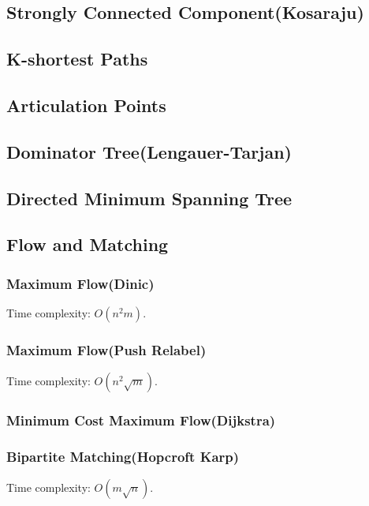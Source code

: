 \documentclass{article}
\begin{document}
    \subsection{Strongly Connected Component(Kosaraju)}
    
    \subsection{K-shortest Paths}

    \subsection{Articulation Points}
    
    \subsection{Dominator Tree(Lengauer-Tarjan)}
    
    \subsection{Directed Minimum Spanning Tree}
    
    \subsection{Flow and Matching}
        \subsubsection{Maximum Flow(Dinic)}
            Time complexity: $O(n^2m)$.
            
        \subsubsection{Maximum Flow(Push Relabel)}
            Time complexity: $O(n^2\sqrt m)$.
            
        \subsubsection{Minimum Cost Maximum Flow(Dijkstra)}
            
        \subsubsection{Bipartite Matching(Hopcroft Karp)}
            Time complexity: $O(m\sqrt n)$.
            
\end{document}
